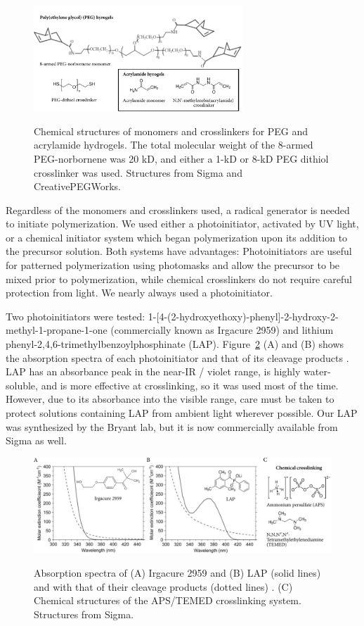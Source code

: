 \begin{figure}
\caption{Chemical structures of monomers and crosslinkers for PEG and acrylamide hydrogels. The total molecular weight of the 8-armed PEG-norbornene was 20 kD, and either a 1-kD or 8-kD PEG dithiol crosslinker was used.  Structures from Sigma and CreativePEGWorks.}
\centering
\includegraphics[width=0.7\textwidth]{figs/ch03/monomer-and-crosslinker}
\label{fig:monomer-crosslinker}
\end{figure}

Regardless of the monomers and crosslinkers used, a radical generator is needed to initiate polymerization.  We used either a photoinitiator, activated by UV light, or a chemical initiator system which began polymerization upon its addition to the precursor solution.  Both systems have advantages: Photoinitiators are useful for patterned polymerization using photomasks and allow the precursor to be mixed prior to polymerization, while chemical crosslinkers do not require careful protection from light.  We nearly always used a photoinitiator.

Two photoinitiators were tested: 1-[4-(2-hydroxyethoxy)-phenyl]-2-hydroxy-2-methyl-1-propane-1-one (commercially known as Irgacure 2959) and lithium phenyl-2,4,6-trimethylbenzoylphosphinate (LAP). %
Figure~\ref{fig:initiators} (A) and (B) shows the absorption spectra of each photoinitiator and that of its cleavage products \cite{fairbanks09}.  LAP has an absorbance peak in the near-IR / violet range, is highly water-soluble, and is more effective at crosslinking, so it was used most of the time.  However, due to its absorbance into the visible range, care must be taken to protect solutions containing LAP from ambient light wherever possible.  Our LAP was synthesized by the Bryant lab, but it is now commercially available from Sigma as well.

\begin{figure}
\caption{Absorption spectra of (A) Irgacure 2959 and (B) LAP (solid lines) and with that of their cleavage products (dotted lines) \cite{fairbanks09}. (C) Chemical structures of the APS/TEMED crosslinking system. Structures from Sigma.}
\centering
\includegraphics[width=\textwidth]{figs/ch03/initiators}
\label{fig:initiators}
\end{figure}

